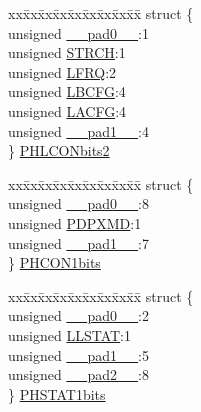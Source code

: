 \begin{DoxyCompactItemize}
\begin{tabbing}
\end{tabbing}\item 
\begin{tabbing}
xx\=xx\=xx\=xx\=xx\=xx\=xx\=xx\=xx\=\kill
struct \{\\
\>unsigned \hyperlink{union_p_h_y_r_e_g_adf71f3d8410c1f1dbbc96680a92c49af}{\_\_pad0\_\_}:1\\
\>unsigned \hyperlink{union_p_h_y_r_e_g_af010f4597cbdc0e2da9f9b03319e4f09}{STRCH}:1\\
\>unsigned \hyperlink{union_p_h_y_r_e_g_adc4d465d5ddb914b88bc5630745de6e3}{LFRQ}:2\\
\>unsigned \hyperlink{union_p_h_y_r_e_g_ab1f5c2c76d0ea6e0d65533a3dba9b791}{LBCFG}:4\\
\>unsigned \hyperlink{union_p_h_y_r_e_g_a4068b3545091b33a93a87b70e24ca5de}{LACFG}:4\\
\>unsigned \hyperlink{union_p_h_y_r_e_g_acaf2d0924a107ec6e8d2e31febaf66f9}{\_\_pad1\_\_}:4\\
\} \hyperlink{union_p_h_y_r_e_g_a87ca17ac86031992ec7f9c2e47c80f62}{PHLCONbits2}\\

\end{tabbing}\item 
\begin{tabbing}
xx\=xx\=xx\=xx\=xx\=xx\=xx\=xx\=xx\=\kill
struct \{\\
\>unsigned \hyperlink{union_p_h_y_r_e_g_adf71f3d8410c1f1dbbc96680a92c49af}{\_\_pad0\_\_}:8\\
\>unsigned \hyperlink{union_p_h_y_r_e_g_a2e0978ce52433ab2192b913a8aea44ff}{PDPXMD}:1\\
\>unsigned \hyperlink{union_p_h_y_r_e_g_acaf2d0924a107ec6e8d2e31febaf66f9}{\_\_pad1\_\_}:7\\
\} \hyperlink{union_p_h_y_r_e_g_a9f2e85166dfcae25fc93b49b11490ba3}{PHCON1bits}\\

\end{tabbing}\item 
\begin{tabbing}
xx\=xx\=xx\=xx\=xx\=xx\=xx\=xx\=xx\=\kill
struct \{\\
\>unsigned \hyperlink{union_p_h_y_r_e_g_adf71f3d8410c1f1dbbc96680a92c49af}{\_\_pad0\_\_}:2\\
\>unsigned \hyperlink{union_p_h_y_r_e_g_af87708a3a79878920e12bf308f26773a}{LLSTAT}:1\\
\>unsigned \hyperlink{union_p_h_y_r_e_g_acaf2d0924a107ec6e8d2e31febaf66f9}{\_\_pad1\_\_}:5\\
\>unsigned \hyperlink{union_p_h_y_r_e_g_a4d97cc5f7d51d22fc2bf3eab35c9cb7f}{\_\_pad2\_\_}:8\\
\} \hyperlink{union_p_h_y_r_e_g_a383b8b6abb3823d48b80e397998536e2}{PHSTAT1bits}\\


\end{tabbing}
\end{DoxyCompactItemize}
